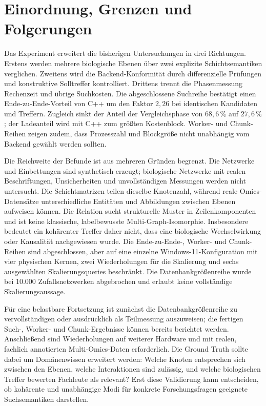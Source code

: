 \documentclass[a4paper,12pt, twoside]{report}
\theoremstyle{definition}
\begin{document}
\section{Einordnung, Grenzen und Folgerungen}
\label{sec:multiomics_discussion}

Das Experiment erweitert die bisherigen Untersuchungen in drei Richtungen. Erstens werden mehrere biologische Ebenen über zwei explizite Schichtsemantiken verglichen. Zweitens wird die Backend-Konformität durch differenzielle Prüfungen und konstruktive Solltreffer kontrolliert. Drittens trennt die Phasenmessung Rechenzeit und übrige Suchkosten. Die abgeschlossene Suchreihe bestätigt einen Ende-zu-Ende-Vorteil von C++ um den Faktor $2{,}26$ bei identischen Kandidaten und Treffern. Zugleich sinkt der Anteil der Vergleichsphase von $68{,}6\,\%$ auf $27{,}6\,\%$; der Ladeanteil wird mit C++ zum größten Kostenblock. Worker- und Chunk-Reihen zeigen zudem, dass Prozesszahl und Blockgröße nicht unabhängig vom Backend gewählt werden sollten.

Die Reichweite der Befunde ist aus mehreren Gründen begrenzt. Die Netzwerke und Einbettungen sind synthetisch erzeugt; biologische Netzwerke mit realen Beschriftungen, Unsicherheiten und unvollständigen Messungen werden nicht untersucht. Die Schichtmatrizen teilen dieselbe Knotenzahl, während reale Omics-Datensätze unterschiedliche Entitäten und Abbildungen zwischen Ebenen aufweisen können. Die Relation sucht strukturelle Muster in Zeilenkomponenten und ist keine klassische, labelbewusste Multi-Graph-Isomorphie. Insbesondere bedeutet ein kohärenter Treffer daher nicht, dass eine biologische Wechselwirkung oder Kausalität nachgewiesen wurde. Die Ende-zu-Ende-, Worker- und Chunk-Reihen sind abgeschlossen, aber auf eine einzelne Windows-11-Konfiguration mit vier physischen Kernen, zwei Wiederholungen für die Skalierung und sechs ausgewählten Skalierungsqueries beschränkt. Die Datenbankgrößenreihe wurde bei 10.000 Zufallsnetzwerken abgebrochen und erlaubt keine vollständige Skalierungsaussage.

Für eine belastbare Fortsetzung ist zunächst die Datenbankgrößenreihe zu vervollständigen oder ausdrücklich als Teilmessung auszuweisen; die fertigen Such-, Worker- und Chunk-Ergebnisse können bereits berichtet werden. Anschließend sind Wiederholungen auf weiterer Hardware und mit realen, fachlich annotierten Multi-Omics-Daten erforderlich. Die Ground Truth sollte dabei um Domänenwissen erweitert werden: Welche Knoten entsprechen sich zwischen den Ebenen, welche Interaktionen sind zulässig, und welche biologischen Treffer bewerten Fachleute als relevant? Erst diese Validierung kann entscheiden, ob kohärente und unabhängige Modi für konkrete Forschungsfragen geeignete Suchsemantiken darstellen.
\end{document}
